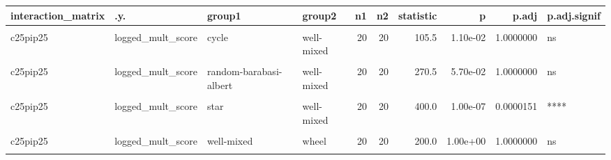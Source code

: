 \documentclass[
]{book}
\begin{document}
\begin{table}
\centering
\begin{tabular}{l|l|l|l|r|r|r|r|r|l}
\hline
interaction\_matrix & .y. & group1 & group2 & n1 & n2 & statistic & p & p.adj & p.adj.signif\\
\hline
\cellcolor{gray!6}{c25pip25} & \cellcolor{gray!6}{logged\_mult\_score} & \cellcolor{gray!6}{comet-kite} & \cellcolor{gray!6}{well-mixed} & \cellcolor{gray!6}{20} & \cellcolor{gray!6}{20} & \cellcolor{gray!6}{400.0} & \cellcolor{gray!6}{1.00e-07} & \cellcolor{gray!6}{0.0000151} & \cellcolor{gray!6}{****}\\
\hline
c25pip25 & logged\_mult\_score & cycle & well-mixed & 20 & 20 & 105.5 & 1.10e-02 & 1.0000000 & ns\\
\hline
\cellcolor{gray!6}{c25pip25} & \cellcolor{gray!6}{logged\_mult\_score} & \cellcolor{gray!6}{linear-chain} & \cellcolor{gray!6}{well-mixed} & \cellcolor{gray!6}{20} & \cellcolor{gray!6}{20} & \cellcolor{gray!6}{181.0} & \cellcolor{gray!6}{6.16e-01} & \cellcolor{gray!6}{1.0000000} & \cellcolor{gray!6}{ns}\\
\hline
c25pip25 & logged\_mult\_score & random-barabasi-albert & well-mixed & 20 & 20 & 270.5 & 5.70e-02 & 1.0000000 & ns\\
\hline
\cellcolor{gray!6}{c25pip25} & \cellcolor{gray!6}{logged\_mult\_score} & \cellcolor{gray!6}{random-waxman} & \cellcolor{gray!6}{well-mixed} & \cellcolor{gray!6}{20} & \cellcolor{gray!6}{20} & \cellcolor{gray!6}{354.5} & \cellcolor{gray!6}{2.91e-05} & \cellcolor{gray!6}{0.0048430} & \cellcolor{gray!6}{**}\\
\hline
c25pip25 & logged\_mult\_score & star & well-mixed & 20 & 20 & 400.0 & 1.00e-07 & 0.0000151 & ****\\
\hline
\cellcolor{gray!6}{c25pip25} & \cellcolor{gray!6}{logged\_mult\_score} & \cellcolor{gray!6}{toroidal-lattice} & \cellcolor{gray!6}{well-mixed} & \cellcolor{gray!6}{20} & \cellcolor{gray!6}{20} & \cellcolor{gray!6}{53.5} & \cellcolor{gray!6}{6.37e-05} & \cellcolor{gray!6}{0.0101920} & \cellcolor{gray!6}{*}\\
\hline
c25pip25 & logged\_mult\_score & well-mixed & wheel & 20 & 20 & 200.0 & 1.00e+00 & 1.0000000 & ns\\
\hline
\cellcolor{gray!6}{c25pip25} & \cellcolor{gray!6}{logged\_mult\_score} & \cellcolor{gray!6}{well-mixed} & \cellcolor{gray!6}{windmill} & \cellcolor{gray!6}{20} & \cellcolor{gray!6}{20} & \cellcolor{gray!6}{378.0} & \cellcolor{gray!6}{1.40e-06} & \cellcolor{gray!6}{0.0002808} & \cellcolor{gray!6}{***}\\

\end{tabular}
\end{table}
\end{document}
